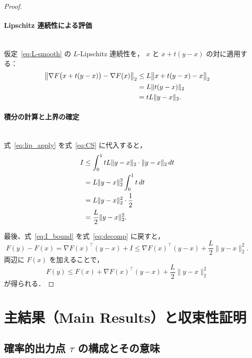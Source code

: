 \documentclass[dvipdfmx,a4paper,11pt]{jsarticle}
\begin{document}
\begin{proof}
\paragraph{Lipschitz 連続性による評価}\ \\

仮定~\eqref{eq:L-smooth} の $L$-Lipschitz 連続性を，
$x$ と $x + t(y-x)$ の対に適用する：
\begin{align}
    \bigl\|\nabla F\bigl(x + t(y-x)\bigr) - \nabla F(x)\bigr\|_2
    &\leq L \bigl\|x + t(y-x) - x\bigr\|_2 \notag \\
    &= L \|t(y-x)\|_2 \notag \\
    &= tL\|y-x\|_2.
    \label{eq:lip_apply}
\end{align}

\paragraph{積分の計算と上界の確定}\ \\

式~\eqref{eq:lip_apply} を式~\eqref{eq:CS} に代入すると，
\begin{align}
    I
    &\leq \int_0^1 tL\|y-x\|_2 \cdot \|y-x\|_2\, dt \notag \\
    &= L\|y-x\|_2^2 \int_0^1 t\, dt \notag \\
    &= L\|y-x\|_2^2 \cdot \frac{1}{2} \notag \\
    &= \frac{L}{2}\|y-x\|_2^2.
    \label{eq:I_bound}
\end{align}

最後、式~\eqref{eq:I_bound} を式~\eqref{eq:decomp} に戻すと，
\begin{equation}
    F(y) - F(x)
    = \nabla F(x)^\top (y-x) + I
    \leq \nabla F(x)^\top (y-x) + \frac{L}{2}\|y-x\|_2^2.
\end{equation}
両辺に $F(x)$ を加えることで，
\begin{equation}
    F(y) \leq F(x) + \nabla F(x)^\top (y-x) + \frac{L}{2}\|y-x\|_2^2
\end{equation}
が得られる．
\end{proof}
\section{主結果（Main Results）と収束性証明}

\subsection{確率的出力点 $\tau$ の構成とその意味}
\end{document}
